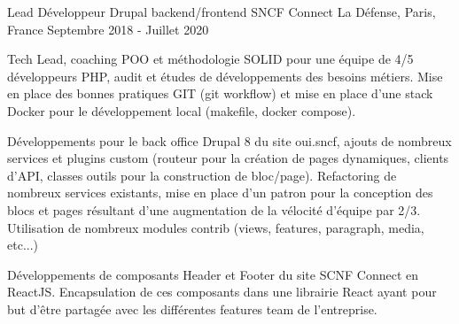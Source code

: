 \cventry
{Lead Développeur Drupal backend/frontend} %
{SNCF Connect} %
{La Défense, Paris, France} %
{Septembre 2018 - Juillet 2020} %
{
\begin{cvitems} %
    \item
    {
        Tech Lead, coaching POO et méthodologie SOLID pour une équipe de 4/5 développeurs PHP, audit et études
        de développements des besoins métiers. Mise en place des bonnes pratiques GIT (git workflow) et mise en place
        d'une stack Docker pour le développement local (makefile, docker compose).
    }
    \item
    {
        Développements pour le back office Drupal 8 du site oui.sncf, ajouts de nombreux services et plugins custom
        (routeur pour la création de pages dynamiques, clients d’API, classes outils pour la construction de bloc/page).
        Refactoring de nombreux services existants, mise en place d’un patron pour la conception des blocs et pages
        résultant d'une augmentation de la vélocité d’équipe par 2/3. Utilisation de nombreux
        modules contrib (views, features, paragraph, media, etc...)
    }
    \item
    {
        Développements de composants Header et Footer du site SCNF Connect en ReactJS. Encapsulation de ces composants dans
        une librairie React ayant pour but d’être partagée avec les différentes features team de l’entreprise.
    }
\end{cvitems}
}
